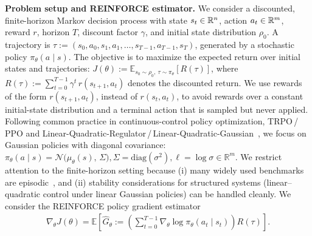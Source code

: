 \textbf{Problem setup and REINFORCE estimator.}
We consider a discounted, finite-horizon Markov decision process with state $s_t \in { {\mathbb R}^{n} }$, action $a_t \in { {\mathbb R}^{m} }$, reward $r$, horizon $T$, discount factor $\gamma$, and initial state distribution $\rho_0$.
A trajectory is $\tau := (s_0,a_0,s_1,a_1,\dots,s_{T-1},a_{T-1},s_T)$, generated by a stochastic policy $\pi_\theta(a\mid s)$.
The objective is to maximize the expected return over initial states and trajectories:
$J(\theta) := \mathbb{E}_{s_0\sim\rho_0,\ \tau\sim\pi_\theta}\!\left[R(\tau)\right]$, where
$R(\tau):=\sum_{t=0}^{T-1}\gamma^t\, r(s_{t+1},a_t)$ denotes the discounted return.
We use rewards of the form $r(s_{t+1},a_t)$, instead of $r(s_t,a_t)$, to avoid rewards over a constant initial-state distribution and a terminal action that is sampled but never applied. 
Following common practice in continuous-control policy optimization, \eg TRPO\,/\,PPO and Linear-Quadratic-Regulator\,/\,Linear-Quadratic-Gaussian~\cite{schulman15icml-trpo,schulman17arxiv-ppo,fazel18icml-lqrglobal},
we focus on Gaussian policies with diagonal covariance:
$
\pi_\theta(a\mid s)=\mathcal{N}\big(\mu_\theta(s),\,\Sigma\big),
\Sigma=\mathrm{diag}(\sigma^2),
\ell=\log\sigma\in\mathbb{R}^m.
$
We restrict attention to the finite-horizon setting because (i) many widely used benchmarks are episodic~\cite{brockman16arxiv-gym}, and (ii) stability considerations for structured systems (\eg linear--quadratic control under linear Gaussian policies) can be handled cleanly. We consider the REINFORCE policy gradient estimator
\begin{align}\label{eq:policy_gradient_theorem_1}
\nabla_\theta J(\theta)\!=\!\mathbb{E}\!\left[\widehat G_\theta\!:=\!\left(\sum_{t=0}^{T-1} \nabla_\theta \log \pi_\theta(a_t\mid s_t)\right)\!R(\tau)\right]\!\!.\!\!
\end{align}

